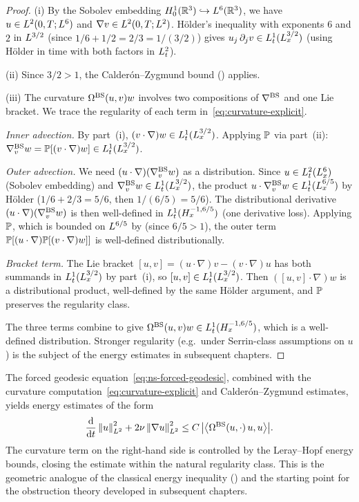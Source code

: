 \begin{proof}
  (i) By the Sobolev embedding $H^{1}_0(\mathbb{R}^3) \hookrightarrow L^{6}(\mathbb{R}^3)$, we have
  $u \in L^{2}(0,T;L^{6})$ and $\nabla v \in L^{2}(0,T;L^{2})$.  H\"{o}lder's
  inequality with exponents $6$ and $2$ in $L^{3/2}$ (since $1/6 + 1/2 = 2/3 = 1/(3/2)$)
  gives $u_j\,\partial_j v \in L^{1}_t(L^{3/2}_x)$ (using H\"{o}lder in time with
  both factors in $L^{2}_t$).

  (ii) Since $3/2 > 1$, the Calder\'{o}n--Zygmund bound () applies.

  (iii) The curvature $\Omega^{\mathrm{BS}}(u,v)w$ involves two compositions of $\nabla^{\mathrm{BS}}$ and one
  Lie bracket.  We trace the regularity of each term in~\eqref{eq:curvature-explicit}.

  \emph{Inner advection.}
  By part~(i), $(v\cdot\nabla)w \in L^{1}_t(L^{3/2}_x)$.
  Applying $\mathbb{P}$ via part~(ii):
  $\nabla^{\mathrm{BS}}_v w = \mathbb{P}[(v\cdot\nabla)w] \in L^{1}_t(L^{3/2}_x)$.

  \emph{Outer advection.}
  We need $(u\cdot\nabla)(\nabla^{\mathrm{BS}}_v w)$ as a distribution.
  Since $u \in L^{2}_t(L^{6}_x)$ (Sobolev embedding) and
  $\nabla^{\mathrm{BS}}_v w \in L^{1}_t(L^{3/2}_x)$, the product
  $u \cdot \nabla^{\mathrm{BS}}_v w \in L^{1}_t(L^{6/5}_x)$
  by H\"{o}lder ($1/6 + 2/3 = 5/6$, then $1/(6/5) = 5/6$).
  The distributional derivative $(u\cdot\nabla)(\nabla^{\mathrm{BS}}_v w)$ is then
  well-defined in $L^{1}_t(H^{-1,6/5}_x)$ (one derivative loss).
  Applying $\mathbb{P}$, which is bounded on $L^{6/5}$ by 
  (since $6/5 > 1$), the outer term
  $\mathbb{P}[(u\cdot\nabla)\mathbb{P}[(v\cdot\nabla)w]]$ is well-defined
  distributionally.

  \emph{Bracket term.}
  The Lie bracket $[u,v] = (u\cdot\nabla)v - (v\cdot\nabla)u$ has both
  summands in $L^{1}_t(L^{3/2}_x)$ by part~(i), so
  $[u,v] \in L^{1}_t(L^{3/2}_x)$.  Then
  $([u,v]\cdot\nabla)w$ is a distributional product, well-defined by the
  same H\"{o}lder argument, and $\mathbb{P}$ preserves the regularity class.

  The three terms combine to give
  $\Omega^{\mathrm{BS}}(u,v)w \in L^{1}_t(H^{-1,6/5}_x)$, which is a well-defined
  distribution.  Stronger regularity (e.g.\ under Serrin-class assumptions on $u$)
  is the subject of the energy estimates in subsequent chapters.
\end{proof}

\begin{remark}
  The forced geodesic equation~\eqref{eq:ns-forced-geodesic},
  combined with the curvature
  computation~\eqref{eq:curvature-explicit} and
  Calder\'{o}n--Zygmund estimates, yields energy estimates of the
  form
  \[
    \frac{\mathrm{d}}{\mathrm{d} t}\left\lVert u \right\rVert^2_{L^{2}}
    + 2\nu\left\lVert \nabla u \right\rVert_{L^{2}}^2
    \leq C\,\bigl|\left\langle \Omega^{\mathrm{BS}}(u, \cdot)\,u, u \right\rangle\bigr|.
  \]
  The curvature term on the right-hand side is controlled by the Leray--Hopf energy bounds,
  closing the estimate within the natural regularity class.  This is the geometric analogue
  of the classical energy inequality () and the starting
  point for the obstruction theory developed in subsequent chapters.
\end{remark}

